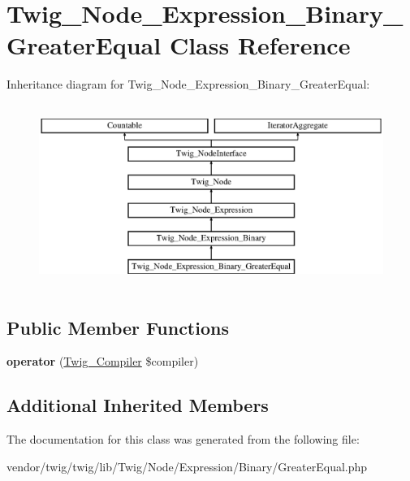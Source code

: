 \hypertarget{classTwig__Node__Expression__Binary__GreaterEqual}{}\section{Twig\+\_\+\+Node\+\_\+\+Expression\+\_\+\+Binary\+\_\+\+Greater\+Equal Class Reference}
\label{classTwig__Node__Expression__Binary__GreaterEqual}
Inheritance diagram for Twig\+\_\+\+Node\+\_\+\+Expression\+\_\+\+Binary\+\_\+\+Greater\+Equal\+:\begin{figure}[H]
\begin{center}
\leavevmode
\includegraphics[height=6.000000cm]{classTwig__Node__Expression__Binary__GreaterEqual}
\end{center}
\end{figure}
\subsection*{Public Member Functions}
\begin{DoxyCompactItemize}
\item 
{\bfseries operator} (\hyperlink{classTwig__Compiler}{Twig\+\_\+\+Compiler} \$compiler)\hypertarget{classTwig__Node__Expression__Binary__GreaterEqual_adbfff07bf16536dcb9dcbba2b589e1b3}{}\label{classTwig__Node__Expression__Binary__GreaterEqual_adbfff07bf16536dcb9dcbba2b589e1b3}

\end{DoxyCompactItemize}
\subsection*{Additional Inherited Members}


The documentation for this class was generated from the following file\+:\begin{DoxyCompactItemize}
\item 
vendor/twig/twig/lib/\+Twig/\+Node/\+Expression/\+Binary/Greater\+Equal.\+php\end{DoxyCompactItemize}
